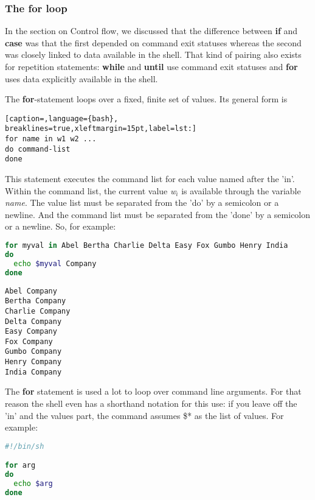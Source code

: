 \subsubsection{The for loop}
In the section on Control flow, we discussed that the difference between
\textbf{if} and \textbf{case} was that the first depended on command exit
statuses whereas the second was closely linked to data available in the shell.
That kind of pairing also exists for repetition statements: \textbf{while} and
\textbf{until} use command exit statuses and \textbf{for} uses data explicitly
available in the shell.

The \textbf{for}-statement loops over a fixed, finite set of values. Its
general form is
\lstset{basicstyle=\scriptsize, numbers=left, captionpos=b, tabsize=4}
\begin{lstlisting}[caption=,language={bash},
breaklines=true,xleftmargin=15pt,label=lst:]
for name in w1 w2 ...
do command-list
done
\end{lstlisting}

This statement executes the command list for each value named after the 'in'.
Within the command list, the current value \emph{w\(_{i}\)} is available
through the variable \emph{name}. The value list must be separated from the
'do' by a semicolon or a newline. And the command list must be separated from
the 'done' by a semicolon or a newline. So, for example:

\lstset{basicstyle=\scriptsize, numbers=left, captionpos=b, tabsize=4}
\begin{lstlisting}[caption=A for loop that prints some values,language={bash},
breaklines=true,xleftmargin=15pt,label=lst:A for loop that prints some values]
for myval in Abel Bertha Charlie Delta Easy Fox Gumbo Henry India
do
  echo $myval Company
done
\end{lstlisting}

\scriptsize
\begin{verbatim}
Abel Company
Bertha Company
Charlie Company
Delta Company
Easy Company
Fox Company
Gumbo Company
Henry Company
India Company
\end{verbatim}
\normalsize

The \textbf{for} statement is used a lot to loop over command line arguments.
For that reason the shell even has a shorthand notation for this use: if you
leave off the 'in' and the values part, the command assumes \$* as the list of
values. For example:
\lstset{basicstyle=\scriptsize, numbers=left, captionpos=b, tabsize=4}
\begin{lstlisting}[caption=Using for to loop over command line arguments,language={bash},
breaklines=true,xleftmargin=15pt,label=lst:Using for to loop over command line arguments]
#!/bin/sh

for arg
do
  echo $arg
done
\end{lstlisting}

